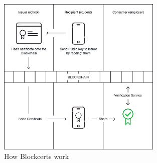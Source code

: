 \begin{figure}[!ht]
	\centering
	\includegraphics[width=0.7\textwidth]{blockcerts}
	\caption[How Blockcerts work]
	{How Blockcerts work \citep{blockcerts2018}}
	\label{fig:blockcerts}
\end{figure}






